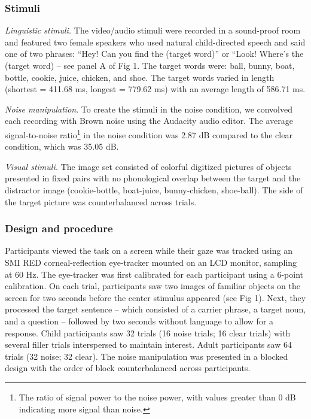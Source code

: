 \documentclass[10pt, letterpaper]{article}
\begin{document}
\subsubsection{Stimuli}\label{stimuli}

\emph{Linguistic stimuli.} The video/audio stimuli were recorded in a
sound-proof room and featured two female speakers who used natural
child-directed speech and said one of two phrases: ``Hey! Can you find
the (target word)'' or ``Look! Where's the (target word) -- see panel A
of Fig 1. The target words were: ball, bunny, boat, bottle, cookie,
juice, chicken, and shoe. The target words varied in length (shortest =
411.68 ms, longest = 779.62 ms) with an average length of 586.71 ms.

\emph{Noise manipulation}. To create the stimuli in the noise condition,
we convolved each recording with Brown noise using the Audacity audio
editor. The average signal-to-noise ratio\footnote{The ratio of signal
  power to the noise power, with values greater than 0 dB indicating
  more signal than noise.} in the noise condition was 2.87 dB compared
to the clear condition, which was 35.05 dB.

\emph{Visual stimuli.} The image set consisted of colorful digitized
pictures of objects presented in fixed pairs with no phonological
overlap between the target and the distractor image (cookie-bottle,
boat-juice, bunny-chicken, shoe-ball). The side of the target picture
was counterbalanced across trials.

\subsubsection{Design and procedure}\label{design-and-procedure}

Participants viewed the task on a screen while their gaze was tracked
using an SMI RED corneal-reflection eye-tracker mounted on an LCD
monitor, sampling at 60 Hz. The eye-tracker was first calibrated for
each participant using a 6-point calibration. On each trial,
participants saw two images of familiar objects on the screen for two
seconds before the center stimulus appeared (see Fig 1). Next, they
processed the target sentence -- which consisted of a carrier phrase, a
target noun, and a question -- followed by two seconds without language
to allow for a response. Child participants saw 32 trials (16 noise
trials; 16 clear trials) with several filler trials interspersed to
maintain interest. Adult participants saw 64 trials (32 noise; 32
clear). The noise manipulation was presented in a blocked design with
the order of block counterbalanced across participants.
\end{document}
